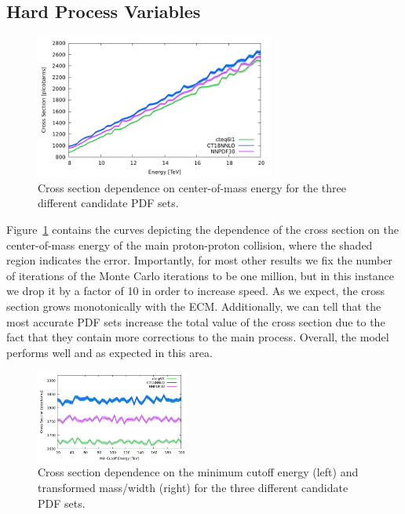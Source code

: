 \subsection{Hard Process Variables}

\begin{figure}[ht]
  \centering
  \includegraphics[width=0.7\textwidth]{./res/gfx/xs.pdf}
  \caption{Cross section dependence on center-of-mass energy for the three different candidate PDF sets.}
  \label{fig:ecm}
\end{figure}

Figure~\ref{fig:ecm} contains the curves depicting the dependence of the cross section on the center-of-mass energy of the main proton-proton collision, where the shaded region indicates the error. Importantly, for most other results we fix the number of iterations of the Monte Carlo iterations to be one million, but in this instance we drop it by a factor of 10 in order to increase speed. As we expect, the cross section grows monotonically with the ECM. Additionally, we can tell that the most accurate PDF sets increase the total value of the cross section due to the fact that they contain more corrections to the main process. Overall, the model performs well and as expected in this area.


\begin{figure}[ht]
  \centering
  \includegraphics[width=0.45\textwidth]{./res/gfx/cutoff.pdf}
  \caption{Cross section dependence on the minimum cutoff energy (left) and transformed mass/width (right) for the three different candidate PDF sets.}
  \label{fig:cutoff-trans}
\end{figure}

